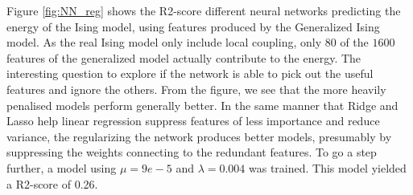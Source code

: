 Figure \autoref{fig:NN_reg} shows the R2-score different neural networks predicting the energy of the Ising model, using features produced by the Generalized Ising model. As the real Ising model only include local coupling, only $80$ of the $1600$ features of the generalized model actually contribute to the energy. The interesting question to explore if the network is able to pick out the useful features and ignore the others. From the figure, we see that the more heavily penalised models perform generally better. In the same manner that Ridge and Lasso help linear regression suppress features of less importance and reduce variance, the regularizing the network produces better models, presumably by suppressing the weights connecting to the redundant features. To go a step further, a model using $\mu = 9e-5$ and $\lambda = 0.004$ was trained. This model yielded a R2-score of 0.26. 

